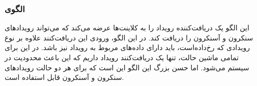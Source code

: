 \subsubsection{الگوی }
\label{smSingleEvRecSec}
\begin{RTL}
این الگو \cite{ref1} یک دریافت‌کننده رویداد را به
کلاینت‌ها عرضه می‌کند که می‌تواند رویدادهای
سنکرون و آسنکرون را دریافت کند. در این الگو، ورودی این دریافت‌کنند علاوه بر
نوع رویدادی که رخ‌داده‌است، باید دارای داده‌های مربوط به رویداد نیز باشد.
در این برای تمامی ماشین حالت، تنها یک دریافت‌کنند رویداد داریم که این باعث
محدودیت در  سیستم می‌شود. اما حسن بزرگ این
الگو این است که برای هر دو حالت رویدادهای سنکرون و آسنکرون قابل
استفاده است. 
\end{RTL}